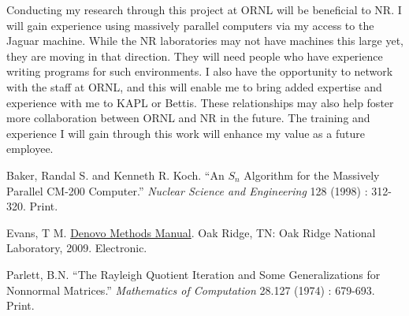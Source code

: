 \documentclass[12pt, letterpaper]{article}
\begin{document}
    Conducting my research through this project at ORNL will be beneficial to NR. I will gain experience using massively parallel computers via my access to the Jaguar machine. While the NR laboratories may not have machines this large yet, they are moving in that direction. They will need people who have experience writing programs for such environments. I also have the opportunity to network with the staff at ORNL, and this will enable me to bring added expertise and experience with me to KAPL or Bettis. These relationships may also help foster more collaboration between ORNL and NR in the future. The training and experience I will gain through this work will enhance my value as a future employee.  
    \\
\begin{thebibliography}{3}

  Baker, Randal S. and Kenneth R. Koch. ``An $S_{n}$ Algorithm for the Massively Parallel CM-200 Computer.'' \emph{Nuclear Science and Engineering} 128 (1998) : 312-320. Print.  

  Evans, T M. \underline{Denovo Methods Manual}. Oak Ridge, TN: Oak Ridge National Laboratory, 2009. Electronic. 

  Parlett, B.N. ``The Rayleigh Quotient Iteration and Some Generalizations for Nonnormal Matrices.'' \emph{Mathematics of Computation} 28.127 (1974) : 679-693. Print. 

\end{thebibliography}
\end{document}
